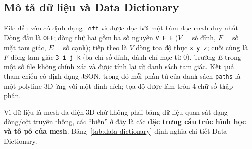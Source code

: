 \subsection{Mô tả dữ liệu và Data Dictionary}

File đầu vào có định dạng \texttt{.off} và được đọc bởi một hàm đọc mesh duy nhất.
Dòng đầu là \texttt{OFF}; dòng thứ hai gồm ba số
nguyên \texttt{V F E} ($V$ = số đỉnh, $F$ = số mặt tam giác, $E$ = số cạnh); tiếp
theo là $V$ dòng tọa độ thực \texttt{x y z}; cuối cùng là $F$ dòng tam giác
\texttt{3 i j k} (ba chỉ số đỉnh, đánh chỉ mục từ 0). Trường $E$ trong một số file
không chính xác và được tính lại từ danh sách tam giác. Kết quả tham chiếu có định
dạng JSON, trong đó mỗi phần tử của danh sách \texttt{paths} là một polyline 3D ứng với một đỉnh đích; tọa độ được làm tròn 4
chữ số thập phân.

Vì dữ liệu là mesh đa diện 3D chứ không phải bảng dữ liệu quan sát dạng dòng/cột
truyền thống, các ``biến'' ở đây là các \textbf{đặc trưng cấu trúc hình học và tô
pô của mesh}. Bảng~\ref{tab:data-dictionary} định nghĩa chi tiết Data Dictionary.

